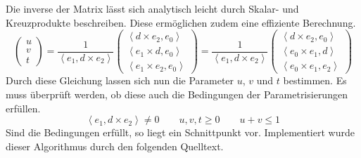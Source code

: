 \documentclass[crop=false]{standalone}
\begin{document}
      Die inverse der Matrix lässt sich analytisch leicht durch Skalar- und Kreuzprodukte beschreiben.
      Diese ermöglichen zudem eine effiziente Berechnung.
      \[
        \begin{pmatrix}
          u \\
          v \\
          t
        \end{pmatrix}
        =
        \frac{1}{\left\langle e_1, d\times e_2  \right\rangle}
        \begin{pmatrix}
          \left\langle d\times e_2 , e_0 \right\rangle \\
          \left\langle e_1\times d , e_0 \right\rangle \\
          \left\langle e_1\times e_2, e_0 \right\rangle
        \end{pmatrix}
        =
        \frac{1}{\left\langle e_1, d\times e_2  \right\rangle}
        \begin{pmatrix}
          \left\langle d\times e_2 , e_0 \right\rangle \\
          \left\langle e_0\times e_1 , d \right\rangle \\
          \left\langle e_0\times e_1, e_2 \right\rangle
        \end{pmatrix}
      \]
      Durch diese Gleichung lassen sich nun die Parameter $u$, $v$ und $t$ bestimmen.
      Es muss überprüft werden, ob diese auch die Bedingungen der Parametrisierungen erfüllen.
      \[
        \left\langle e_1, d\times e_2  \right\rangle \neq 0
        \qquad
        u,v,t \geq 0
        \qquad
        u+v\leq 1
      \]
      Sind die Bedingungen erfüllt, so liegt ein Schnittpunkt vor.
      Implementiert wurde dieser Algorithmus durch den folgenden Quelltext.


\end{document}
